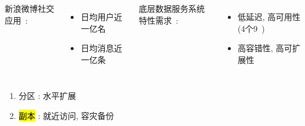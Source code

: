 \begin{frame}{}
  \vspace{0.50cm}

  \begin{columns}
	新浪微博社交应用~\footnotemark:
	\begin{itemize}
	  \item 日均用户近一亿名
	  \item 日均消息近一亿条
	\end{itemize}
	\pause
	底层数据服务系统特性需求~: 
	\begin{itemize}
	  \item 低延迟, 高可用性 (4个9~\footnotemark)
	  \item 高容错性, 高可扩展性
	\end{itemize}
  \end{columns}
  
\end{frame}
\begin{frame}{}
  \graphicspath{{tikz/}}
  \begin{figure}[h!]
    \centering
    \begin{adjustbox}{max totalsize = {0.50\textwidth}{1.00\textheight}, center}
      
    \end{adjustbox}
  \end{figure}

  \vspace{0.20cm}
  \begin{center}
    \begin{minipage}{0.65\textwidth}

      \vspace{0.20cm}
      \begin{enumerate}
	\item<2-> 分区 : 水平扩展
	\item<3-> \hl{副本 }: 就近访问, 容灾备份
      \end{enumerate}
    \end{minipage}
  \end{center}
\end{frame}

